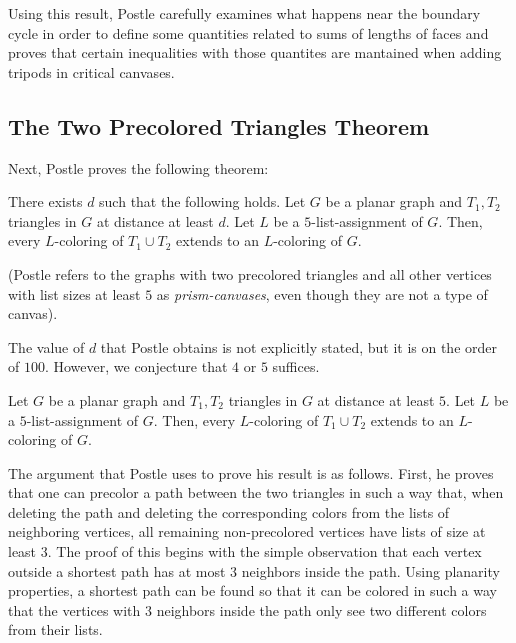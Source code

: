 
Using this result, Postle carefully examines what happens near the boundary cycle in order to define some quantities related to sums of lengths of faces and proves that certain inequalities with those quantites are mantained when adding tripods in critical canvases. 



\subsection{The Two Precolored Triangles Theorem}

Next, Postle proves the following theorem:

\begin{theorem}
	There exists $d$ such that the following holds.
	Let $G$ be a planar graph and $T_1, T_2$ triangles in $G$ at distance at least $d$. Let $L$ be a $5$-list-assignment of $G$. Then, every $L$-coloring of $T_1 \cup T_2$ extends to an $L$-coloring of $G$.
\end{theorem}

(Postle refers to the graphs with two precolored triangles and all other vertices with list sizes
at least $5$ as \emph{prism-canvases}, even though they are not a type of canvas).

The value of $d$ that Postle obtains is not explicitly stated, but it is on the order of $100$. However, we conjecture that $4$ or $5$ suffices.

\begin{conjecture}
\label{twotriangleconjecture}
Let $G$ be a planar graph and $T_1, T_2$ triangles in $G$ at distance at least $5$. Let $L$ be a $5$-list-assignment of $G$. Then, every $L$-coloring of $T_1 \cup T_2$ extends to an $L$-coloring of $G$.
\end{conjecture}

The argument that Postle uses to prove his result is as follows. First, he proves that one can precolor a path between the two triangles in such a way that, when deleting the path and deleting the corresponding colors from the lists of neighboring vertices, all remaining non-precolored vertices have lists of size at least $3$. The proof of this begins with the simple observation that each vertex outside a shortest path has at most $3$ neighbors inside the path. Using planarity properties, a shortest path can be found so that it can be colored in such a way that the vertices with $3$ neighbors inside the path only see two different colors from their lists.

